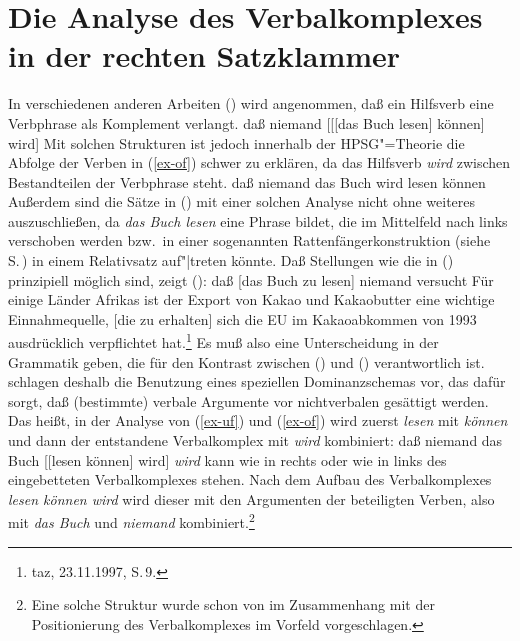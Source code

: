 \section{Die Analyse des Verbalkomplexes in der rechten Satzklammer}
\label{sec-verbalkomplex}

In verschiedenen anderen Arbeiten (\zb {}) 
wird angenommen, daß ein Hilfsverb eine Verbphrase als Komplement verlangt. 
\ea
\label{ex-uf}
daß niemand [[[das Buch lesen] können] wird]
\z
Mit solchen Strukturen ist jedoch innerhalb der HPSG"=Theorie
die Abfolge der Verben in (\ref{ex-of}) schwer zu erklären,
da das Hilfsverb \emph{wird} zwischen Bestandteilen der Verbphrase steht.
\ea
\label{ex-of}
daß niemand das Buch wird lesen können
\z
Außerdem sind die Sätze in () mit einer solchen Analyse nicht ohne weiteres auszuschließen,
da \emph{das Buch lesen} eine Phrase bildet, die im Mittelfeld nach links verschoben
werden bzw.\ in einer sogenannten Rattenfängerkonstruktion (siehe S.\,\pageref{page-rattenfaenger})
in einem Relativsatz auf"|treten könnte.
\eal
{}
\zl
Daß Stellungen wie die in () prinzipiell möglich sind, zeigt ():
\eal
\ex daß [das Buch zu lesen] niemand versucht
\ex Für einige Länder Afrikas ist der Export von Kakao und Kakaobutter eine wichtige
Einnahmequelle, [die zu erhalten] sich die EU im Kakaoabkommen von 1993 ausdrücklich
verpflichtet hat.\footnote{
        taz, 23.11.1997, S.\,9.
}
\zl
Es muß also eine Unterscheidung in der Grammatik geben, die für den Kontrast
zwischen () und () verantwortlich ist.
\citet*{HN94a} 
schlagen deshalb die Benutzung eines speziellen Dominanzschemas vor, 
das dafür sorgt, daß (bestimmte) verbale Argumente vor nichtverbalen gesättigt werden. Das heißt,
in der Analyse von (\ref{ex-uf}) und (\ref{ex-of}) wird zuerst \emph{lesen} mit \emph{können}
und dann der entstandene Verbalkomplex mit \emph{wird} kombiniert:
\ea
\label{ex-struktur-lesen-koennen-wird}
daß niemand das Buch [[lesen können] wird]
\z
\emph{wird} kann wie in  rechts oder wie in  links des eingebetteten Verbalkomplexes
stehen. Nach dem Aufbau des Verbalkomplexes \emph{lesen können wird} wird dieser mit den Argumenten 
der beteiligten Verben, also mit \emph{das Buch} und \emph{niemand} kombiniert.\footnote{
        Eine solche Struktur wurde schon von 
        \citet*{Johnson86a}
        im Zusammenhang mit der Positionierung des Verbalkomplexes im
        Vorfeld vorgeschlagen.
}

